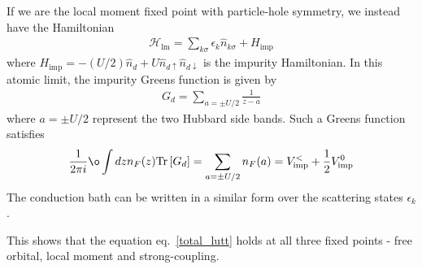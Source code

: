 \documentclass[10pt]{report}
\numberwithin{equation}{section}
\begin{document}
If we are the local moment fixed point with particle-hole symmetry, we instead have the Hamiltonian
\begin{equation}\begin{aligned}
	\mathcal{H}_\text{lm} = \sum_{k\sigma}\epsilon_k \hat n_{k\sigma} + H_\text{imp}
\end{aligned}\end{equation}
where \(H_\text{imp} = -(U/2)\hat n_d + U\hat n_{d \uparrow} \hat n_{d \downarrow}\) is the impurity Hamiltonian. In this atomic limit, the impurity Greens function is given by~\cite{phillips2012advanced}
\begin{equation}\begin{aligned}
	G_d = \sum_{a=\pm U/2} \frac{1}{z - a} 
\end{aligned}\end{equation}
where \(a=\pm U/2\) represent the two Hubbard side bands. Such a Greens function satisfies
\begin{equation}\begin{aligned}
	\frac{1}{2\pi i}\o\int dz n_F(z)\text{Tr}\left[G_d\right] = \sum_{a = \pm U/2}n_F(a) = V_\text{imp}^< + \frac{1}{2}V_\text{imp}^0
\end{aligned}\end{equation}
The conduction bath can be written in a similar form over the scattering states \(\epsilon_k\).

This shows that the equation eq.~\ref{total_lutt} holds at all three fixed points - free orbital, local moment and strong-coupling.
\end{document}
